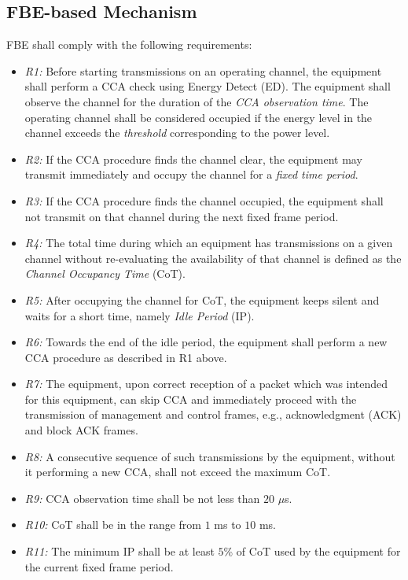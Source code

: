 \subsection{FBE-based Mechanism}
\label{etsi-lbt:fbe}

FBE shall comply with the following requirements:

\begin{itemize}
	
	\item
	\textit{R1:} Before starting transmissions on an operating channel, the equipment shall perform a CCA check using Energy Detect (ED). The equipment shall observe the channel for the duration of the \textit{CCA observation time}. The operating channel shall be considered occupied if the energy level in the channel exceeds the \textit{threshold} corresponding to the power level.
	
	\item
	\textit{R2:}
	If the CCA procedure finds the channel clear, the equipment may transmit immediately and occupy the channel for a \textit{fixed time period}.
	
	\item
	\textit{R3:} If the CCA procedure finds the channel occupied, the equipment shall not transmit on that channel during the next fixed frame period.
	
	\item
	\textit{R4:} The total time during which an equipment has transmissions on a given channel without re-evaluating the availability of that channel is defined as the \textit{Channel Occupancy Time} (CoT).
	
	\item
	\textit{R5:} After occupying the channel for CoT, the equipment keeps silent and waits for a short time, namely \textit{Idle Period} (IP).
	
	\item
	\textit{R6:} Towards the end of the idle period, the equipment shall perform a new CCA procedure as described in R1 above.
	
	\item
	\textit{R7:} The equipment, upon correct reception of a packet which was intended for this equipment, can skip CCA and immediately proceed with the transmission of management and control frames, e.g., acknowledgment (ACK) and block ACK frames.
	
	\item
	\textit{R8:}
	A consecutive sequence of such transmissions by the equipment, without it performing a new CCA, shall not exceed the maximum CoT.
	
	\item
	\textit{R9:}
	CCA observation time shall be not less than $20$ $\mu$s.
	
	\item
	\textit{R10:} CoT shall be in the range from $1$ ms to $10$ ms.
	
	\item
	\textit{R11:}
	The minimum IP shall be at least $5$\% of CoT used by the equipment for the current fixed frame period.
	
\end{itemize}

